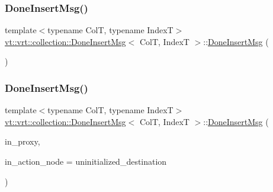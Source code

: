 \subsubsection{\texorpdfstring{Done\+Insert\+Msg()}{DoneInsertMsg()}\hspace{0.1cm}{\footnotesize\ttfamily [1/2]}}
{\footnotesize\ttfamily template$<$typename ColT, typename IndexT$>$ \\
\hyperlink{structvt_1_1vrt_1_1collection_1_1_done_insert_msg}{vt\+::vrt\+::collection\+::\+Done\+Insert\+Msg}$<$ ColT, IndexT $>$\+::\hyperlink{structvt_1_1vrt_1_1collection_1_1_done_insert_msg}{Done\+Insert\+Msg} (\begin{DoxyParamCaption}{ }\end{DoxyParamCaption})\hspace{0.3cm}{\ttfamily [default]}}

\mbox{\label{structvt_1_1vrt_1_1collection_1_1_done_insert_msg_add6d51da4d2b2e79624fb8f153d1cea4}} 
\subsubsection{\texorpdfstring{Done\+Insert\+Msg()}{DoneInsertMsg()}\hspace{0.1cm}{\footnotesize\ttfamily [2/2]}}
{\footnotesize\ttfamily template$<$typename ColT, typename IndexT$>$ \\
\hyperlink{structvt_1_1vrt_1_1collection_1_1_done_insert_msg}{vt\+::vrt\+::collection\+::\+Done\+Insert\+Msg}$<$ ColT, IndexT $>$\+::\hyperlink{structvt_1_1vrt_1_1collection_1_1_done_insert_msg}{Done\+Insert\+Msg} (\begin{DoxyParamCaption}\item[{\hyperlink{structvt_1_1vrt_1_1collection_1_1_collection_proxy}{Collection\+Proxy}$<$ ColT, IndexT $>$}]{in\+\_\+proxy,  }\item[{\hyperlink{namespacevt_a866da9d0efc19c0a1ce79e9e492f47e2}{Node\+Type} const \&}]{in\+\_\+action\+\_\+node = {\ttfamily uninitialized\+\_\+destination} }\end{DoxyParamCaption})\hspace{0.3cm}{\ttfamily [inline]}}



